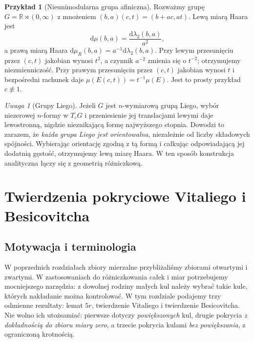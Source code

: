 \documentclass[11pt,a4paper,oneside]{book}
\numberwithin{equation}{chapter}
\theoremstyle{plain}
\theoremstyle{definition}
\newtheorem{przyklad}[twierdzenie]{Przykład}
\theoremstyle{remark}
\newtheorem{uwaga}[twierdzenie]{Uwaga}
\begin{document}
\begin{przyklad}[Nieunimodularna grupa afiniczna]
\label{ex:haar-affine-23}
Rozważmy grupę $G=\mathbb R\rtimes(0,\infty)$
z mnożeniem
$(b,a)(c,t)=(b+ac,at)$. Lewą miarą Haara jest
\[
 \mathrm d\mu(b,a)=\frac{\mathrm d\lambda_2(b,a)}{a^2},
\]
a prawą miarą Haara
$\mathrm d\mu_R(b,a)=a^{-1}\mathrm d\lambda_2(b,a)$.
Przy lewym przesunięciu przez $(c,t)$ jakobian
wynosi $t^2$, a czynnik $a^{-2}$ zmienia się
o $t^{-2}$; otrzymujemy niezmienniczość.
Przy prawym przesunięciu przez $(c,t)$ jakobian
wynosi $t$ i bezpośredni rachunek daje
$\mu(E(c,t))=t^{-1}\mu(E)$.
Jest to prosty przykład $c\not\equiv1$.
\end{przyklad}

\begin{uwaga}[Grupy Liego]
Jeżeli $G$ jest $n$-wymiarową grupą Liego, wybór
niezerowej $n$-formy w $T_eG$ i przeniesienie jej
translacjami lewymi daje lewostronną, nigdzie
nieznikającą formę najwyższego stopnia. Dowodzi to
zarazem, że \emph{każda grupa Liego jest orientowalna},
niezależnie od liczby składowych spójności. Wybierając
orientację zgodną z tą formą i całkując odpowiadającą
jej dodatnią gęstość, otrzymujemy lewą miarę Haara.
W ten sposób konstrukcja analityczna łączy się
z geometrią różniczkową.
\end{uwaga}



\chapter{Twierdzenia pokryciowe Vitaliego i Besicovitcha}
\label{ch:covering-24}

\section{Motywacja i terminologia}
W poprzednich rozdziałach zbiory mierzalne przybliżaliśmy
zbiorami otwartymi i zwartymi. W zastosowaniach do
różniczkowania całek i miar potrzebujemy mocniejszego narzędzia:
z dowolnej rodziny małych kul należy wybrać takie kule, których
nakładanie można kontrolować. W tym rozdziale podajemy trzy
odmienne rezultaty: lemat $5r$, twierdzenie Vitaliego i twierdzenie
Besicovitcha. Nie wolno ich utożsamiać: pierwsze dotyczy
\emph{powiększonych} kul, drugie pokrycia \emph{z dokładnością do
zbioru miary zero}, a trzecie pokrycia kulami \emph{bez powiększania},
z ograniczoną krotnością.
\end{document}

